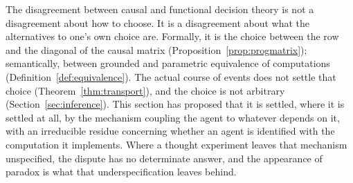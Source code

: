 The disagreement between causal and functional decision theory is not a disagreement about how to
choose. It is a disagreement about what the alternatives to one's own choice are. Formally, it is the
choice between the row and the diagonal of the causal matrix (Proposition~\ref{prop:progmatrix});
semantically, between grounded and parametric equivalence of computations
(Definition~\ref{def:equivalence}). The actual course of events does not settle that choice
(Theorem~\ref{thm:transport}), and the choice is not arbitrary (Section~\ref{sec:inference}). This
section has proposed that it is settled, where it is settled at all, by the mechanism coupling the
agent to whatever depends on it, with an irreducible residue concerning whether an agent is identified
with the computation it implements. Where a thought experiment leaves that mechanism unspecified, the
dispute has no determinate answer, and the appearance of paradox is what that underspecification
leaves behind.
